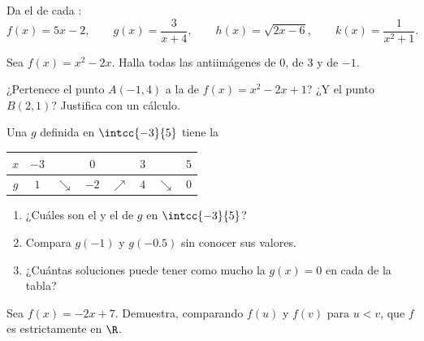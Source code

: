 \begin{exercise}[$\star$]\label{exo:g10:functions:2}
Da el  de cada :
\[
f(x) = 5x - 2, \qquad
g(x) = \frac{3}{x + 4}, \qquad
h(x) = \sqrt{2x - 6}, \qquad
k(x) = \frac{1}{x^2 + 1}.
\]
\end{exercise}

\begin{exercise}[$\star$]\label{exo:g10:functions:3}
Sea $f(x) = x^2 - 2x$. Halla todas las antiimágenes de $0$, de $3$ y de
$-1$.
\end{exercise}

\begin{exercise}[$\star$]\label{exo:g10:functions:4}
¿Pertenece el punto $A(-1, 4)$ a la  de $f(x) = x^2 - 2x + 1$? ¿Y
el punto $B(2, 1)$? Justifica con un cálculo.
\end{exercise}

\begin{exercise}[$\star$]\label{exo:g10:functions:5}
Una  $g$ definida en $\intcc{-3}{5}$ tiene la 
\begin{center}
\renewcommand{\arraystretch}{1.3}
\begin{tabular}{c|ccccccc}
$x$ & $-3$ & & $0$ & & $3$ & & $5$ \\
\hline
$g$ & $1$ & $\searrow$ & $-2$ & $\nearrow$ & $4$ & $\searrow$ & $0$ \\
\end{tabular}
\end{center}
\begin{enumerate}
  \item ¿Cuáles son el  y el  de $g$ en $\intcc{-3}{5}$?
  \item Compara $g(-1)$ y $g(-0.5)$ sin conocer sus valores.
  \item ¿Cuántas soluciones puede tener como mucho la  $g(x) = 0$
        en cada  de la tabla?
\end{enumerate}
\end{exercise}

\begin{exercise}[$\star\star$]\label{exo:g10:functions:6}
Sea $f(x) = -2x + 7$. Demuestra, comparando $f(u)$ y $f(v)$ para $u < v$,
que $f$ es estrictamente  en $\R$.
\end{exercise}

